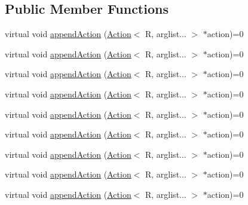 \subsection*{Public Member Functions}
\begin{DoxyCompactItemize}
\item 
virtual void \mbox{\hyperlink{structfakeit_1_1StubbingContext_a01b3a9b0240fa1b7cdd4401b19d04576}{append\+Action}} (\mbox{\hyperlink{structfakeit_1_1Action}{Action}}$<$ R, arglist... $>$ $\ast$action)=0
\item 
virtual void \mbox{\hyperlink{structfakeit_1_1StubbingContext_a01b3a9b0240fa1b7cdd4401b19d04576}{append\+Action}} (\mbox{\hyperlink{structfakeit_1_1Action}{Action}}$<$ R, arglist... $>$ $\ast$action)=0
\item 
virtual void \mbox{\hyperlink{structfakeit_1_1StubbingContext_a01b3a9b0240fa1b7cdd4401b19d04576}{append\+Action}} (\mbox{\hyperlink{structfakeit_1_1Action}{Action}}$<$ R, arglist... $>$ $\ast$action)=0
\item 
virtual void \mbox{\hyperlink{structfakeit_1_1StubbingContext_a01b3a9b0240fa1b7cdd4401b19d04576}{append\+Action}} (\mbox{\hyperlink{structfakeit_1_1Action}{Action}}$<$ R, arglist... $>$ $\ast$action)=0
\item 
virtual void \mbox{\hyperlink{structfakeit_1_1StubbingContext_a01b3a9b0240fa1b7cdd4401b19d04576}{append\+Action}} (\mbox{\hyperlink{structfakeit_1_1Action}{Action}}$<$ R, arglist... $>$ $\ast$action)=0
\item 
virtual void \mbox{\hyperlink{structfakeit_1_1StubbingContext_a01b3a9b0240fa1b7cdd4401b19d04576}{append\+Action}} (\mbox{\hyperlink{structfakeit_1_1Action}{Action}}$<$ R, arglist... $>$ $\ast$action)=0
\item 
virtual void \mbox{\hyperlink{structfakeit_1_1StubbingContext_a01b3a9b0240fa1b7cdd4401b19d04576}{append\+Action}} (\mbox{\hyperlink{structfakeit_1_1Action}{Action}}$<$ R, arglist... $>$ $\ast$action)=0
\item 
virtual void \mbox{\hyperlink{structfakeit_1_1StubbingContext_a01b3a9b0240fa1b7cdd4401b19d04576}{append\+Action}} (\mbox{\hyperlink{structfakeit_1_1Action}{Action}}$<$ R, arglist... $>$ $\ast$action)=0
\item 
virtual void \mbox{\hyperlink{structfakeit_1_1StubbingContext_a01b3a9b0240fa1b7cdd4401b19d04576}{append\+Action}} (\mbox{\hyperlink{structfakeit_1_1Action}{Action}}$<$ R, arglist... $>$ $\ast$action)=0
\end{DoxyCompactItemize}


